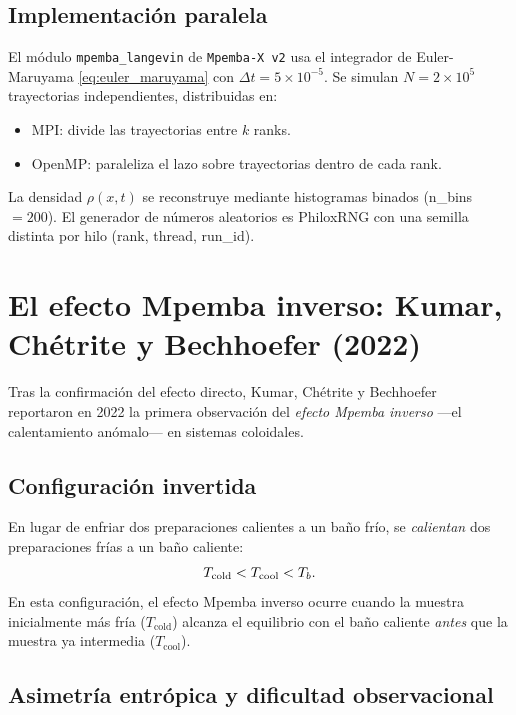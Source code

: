 \subsection{Implementación paralela}

El módulo \texttt{mpemba\_langevin} de \texttt{Mpemba-X v2} usa el integrador 
de Euler-Maruyama \cref{eq:euler_maruyama} con $\Delta t = 5 \times 10^{-5}$. 
Se simulan $N = 2 \times 10^5$ trayectorias independientes, distribuidas en:
\begin{itemize}
\item MPI: divide las trayectorias entre $k$ ranks.
\item OpenMP: paraleliza el lazo sobre trayectorias dentro de cada rank.
\end{itemize}
%
La densidad $\rho(x,t)$ se reconstruye mediante histogramas binados 
(\textsf{n\_bins} $= 200$). El generador de números aleatorios es PhiloxRNG con 
una semilla distinta por hilo (\textsf{rank, thread, run\_id}).

\section{El efecto Mpemba inverso: Kumar, Chétrite y Bechhoefer (2022)}

Tras la confirmación del efecto directo, Kumar, Chétrite y Bechhoefer~\cite{kumarchetrite2022} 
reportaron en 2022 la primera observación del \emph{efecto Mpemba inverso} ---el 
calentamiento anómalo--- en sistemas coloidales.

\subsection{Configuración invertida}

En lugar de enfriar dos preparaciones calientes a un baño frío, se 
\emph{calientan} dos preparaciones frías a un baño caliente:
\begin{equation}
    T_{\mathrm{cold}} < T_{\mathrm{cool}} < T_{b}.
\end{equation}
%
\noindent En esta configuración, el efecto Mpemba inverso ocurre cuando la 
muestra inicialmente más fría ($T_{\mathrm{cold}}$) alcanza el equilibrio con el 
baño caliente \emph{antes} que la muestra ya intermedia ($T_{\mathrm{cool}}$).

\subsection{Asimetría entrópica y dificultad observacional}

